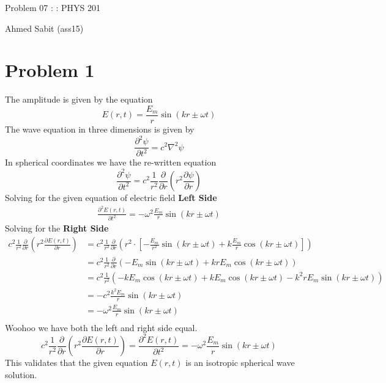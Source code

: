 \documentclass[a4paper]{article}
\begin{document}
\begin{center}
	\begin{Huge}
	Problem 07 : : 	PHYS 201
	\end{Huge}
	\begin{Large}
		Ahmed Sabit (ass15)
	\end{Large}
\end{center}
\vspace{2cm}
\section*{Problem 1} 

The amplitude is given by the equation 
\[
E(r,t) = \frac{E_m}{r} \sin\left(kr \pm \omega t\right)
\] 
The wave equation in three dimensions is given by 
\[
\frac{\partial ^2 \psi}{\partial t ^2} = c^2 
\nabla ^2 \psi
\]
In spherical coordinates we have the re-written equation 
\[
	\frac{\partial ^2 \psi}{\partial t^2} 
	=
c^2 \frac{1}{r^2} \frac{\partial}{\partial r} \left(r^2 \frac{\partial \psi}{\partial r}\right)
\] 
Solving for the given equation of electric field \textbf{Left Side}
\begin{align*}
\frac{\partial ^2 E(r,t)}{\partial t ^2} = 
-\omega^2 \frac{E_m}{r} \sin(kr \pm \omega t )
\end{align*}
Solving for the \textbf{Right Side}
\begin{align*}
c^2	\frac{1}{r^2} \frac{\partial}{\partial r} 
	\left(r^2 \frac{\partial E(r,t)}{\partial r}\right) &= c^2
\frac{1}{r^2} \frac{\partial }{\partial r} 
\left(
r^2 \cdot  \left[
- \frac{E_m}{r^2} \sin\left(kr \pm \omega t\right) + k \frac{E_m}{r} \cos 
\left(kr \pm \omega t\right)
\right]
\right)
	\\
							    &= c^2
\frac{1}{r^2} \frac{\partial }{\partial r} 
\left(
- {E_m} \sin\left(kr \pm \omega t\right) + kr {E_m} \cos 
\left(kr \pm \omega t\right)
\right)
	\\
							    &= c^2
\frac{1}{r^2} 
\left(
- k {E_m} \cos \left(kr \pm \omega t\right) + 
k {E_m} \cos 
\left(kr \pm \omega t\right)
-
k^2r {E_m} \sin 
\left(kr \pm \omega t\right)
\right)
	\\
	&= 
- c^2 \frac{k^2 E_m}{r} \sin(kr \pm \omega t)
\\
&= 
- \omega^2 \frac{E_m}{r} \sin \left(kr \pm \omega t\right)
\tag{$c = \omega / k$ }
\\
\end{align*}
Woohoo we have both the left and right side equal. 
\[
c^2	\frac{1}{r^2} \frac{\partial}{\partial r}
	\left(r^2 \frac{\partial E(r,t)}{\partial r}\right) =
\frac{\partial ^2 E(r,t)}{\partial t ^2} = 
- \omega^2 \frac{E_m}{r} \sin \left(kr \pm \omega t\right)
\] 
This validates that the given equation $E(r,t)$ is an isotropic spherical wave solution.
\end{document}
